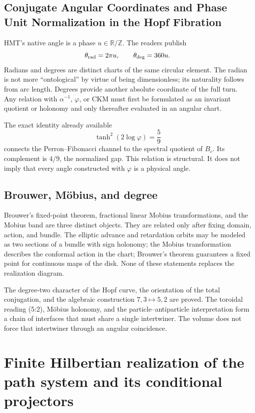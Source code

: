 \subsection{Conjugate Angular Coordinates and Phase Unit Normalization in the Hopf Fibration}

HMT’s native angle is a phase \(u\in\mathbb R/\mathbb Z\). The readers
publish
\[
\theta_{\rm rad}=2\pi u,
\qquad
\theta_{\rm deg}=360u.
\]
Radians and degrees are distinct charts of the same circular element. The radian is not more “ontological” by virtue of being dimensionless; its naturality follows from arc length. Degrees provide another absolute coordinate of the full turn. Any relation with \(\alpha^{-1}\), \(\varphi\), or CKM must first be formulated as an invariant quotient or holonomy and only thereafter evaluated in an angular chart.

The exact identity already available
\[
\tanh^2(2\log\varphi)=\frac59
\]
connects the Perron--Fibonacci channel to the spectral quotient of \(B_c\). Its
complement is \(4/9\), the normalized gap. This relation is structural.
It does not imply that every angle constructed with \(\varphi\) is a physical angle.

\subsection{Brouwer, Möbius, and degree}

Brouwer's fixed-point theorem, fractional linear Mobius transformations,
and the Mobius band are three distinct objects. They are related only
after fixing domain, action, and bundle. The elliptic advance and
retardation orbits may be modeled as two sections of a bundle with sign
holonomy; the Mobius transformation describes the conformal action in the chart;
Brouwer's theorem guarantees a fixed point for continuous maps of the disk.
None of these statements replaces the realization diagram.

\begin{fronteraBox}[title={Result and boundary}]
The degree-two character of the Hopf curve, the orientation of the
total conjugation, and the algebraic construction \(7,3\mapsto5,2\) are proved. The
toroidal reading (5{:}2), Möbius holonomy, and the
particle--antiparticle interpretation form a chain of interfaces that must share a
single intertwiner. The volume does not force that intertwiner through an
angular coincidence.
\end{fronteraBox}


\section{Finite Hilbertian realization of the path system and its conditional projectors}

